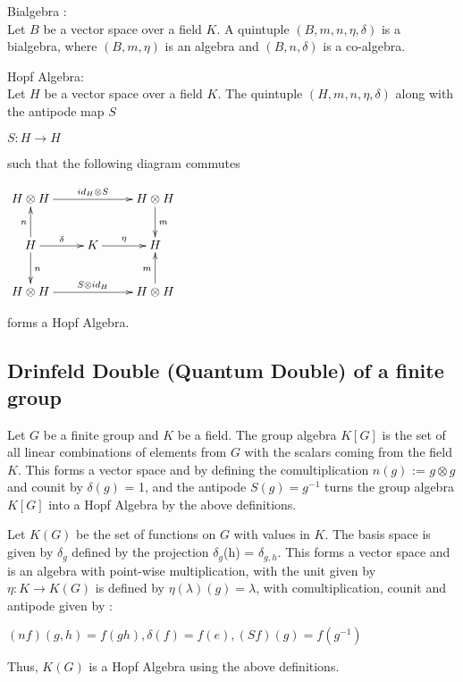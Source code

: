 \begin{defn}
Bialgebra : \\
    Let $B$ be a vector space over a field $K$. A quintuple $(B, m, n, \eta, \delta)$ is a bialgebra, where
$(B,m,\eta)$ is an algebra and $(B,n,\delta)$ is a co-algebra.
\end{defn}


\begin{defn}
Hopf Algebra: \\
      Let $H$ be a vector space over a field $K$. The quintuple $(H, m, n, \eta, \delta)$ along with the antipode map $S$
\begin{center}
    $S : H \rightarrow H$ 
\end{center}
such that the following diagram commutes 
\begin{center}
 $\xymatrix{
 H \otimes H \ar[rr]^{id_{H} \otimes S} & & H \otimes H \ar[d]^{m} \\
 H \ar[r]^{\delta} \ar[u]^{n} \ar[d]^{n} & K \ar[r]^{\eta} & H \\
 H \otimes H \ar[rr]^{S \otimes id_{H}} &  & H \otimes H \ar[u]^{m}
 }$
\end{center}
forms a Hopf Algebra.
\end{defn}

\subsection{Drinfeld Double (Quantum Double) of a finite group}
    Let $G$ be a finite group and $K$ be a field. The group algebra $K[G]$ is the set of all linear combinations of elements from $G$ with 
the scalars coming from the field $K$. This forms a vector space and by defining the comultiplication $n(g)$ := $g \otimes g$ and 
counit by $\delta(g)$ = 1, and the antipode $S(g) = g^{-1}$ turns the group algebra $K[G]$ into a Hopf Algebra by the above definitions.

    Let $K(G)$ be the set of functions on $G$ with values in $K$. The basis space is given by $\delta_{g}$ defined by the projection 
$\delta_{g}$(h) = $\delta_{g,h}$. This forms a vector space and is an algebra with point-wise multiplication, with the unit given by
$\eta : K \rightarrow K(G)$ is defined by $\eta(\lambda)(g) = \lambda$, with comultiplication, counit and antipode given by :
\begin{center}
    $(n f)(g,h) = f(gh), \delta(f) = f(e), (Sf)(g) = f(g^{-1})$
\end{center}
Thus, $K(G)$ is a Hopf Algebra using the above definitions.

